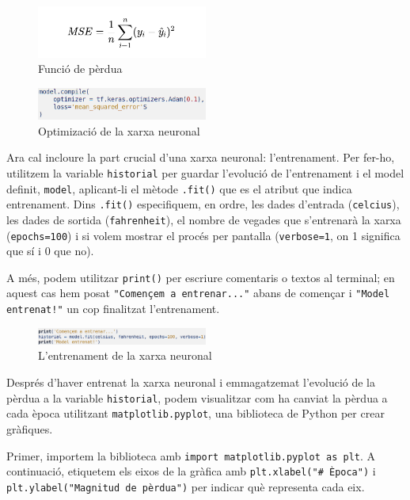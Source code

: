 \begin{figure}[H]
    \centering
    \includegraphics[width=0.5\textwidth]{./figures/5.png}
    \caption{Funció de pèrdua}
\end{figure}


\begin{figure}[H]
    \centering
    \includegraphics[width=0.5\textwidth]{./figures/4.png}
    \caption{Optimizació de la xarxa neuronal}
\end{figure}

Ara cal incloure la part crucial d'una xarxa neuronal: l'entrenament. Per fer-ho, utilitzem la variable \texttt{historial} per guardar l'evolució de l'entrenament i el model definit, \texttt{model}, aplicant-li el mètode \texttt{.fit()} que es el atribut que indica entrenament. Dins \texttt{.fit()} especifiquem, en ordre, les dades d'entrada (\texttt{celcius}), les dades de sortida (\texttt{fahrenheit}), el nombre de vegades que s'entrenarà la xarxa (\texttt{epochs=100}) i si volem mostrar el procés per pantalla (\texttt{verbose=1}, on 1 significa que sí i 0 que no).

A més, podem utilitzar \texttt{print()} per escriure comentaris o textos al terminal; en aquest cas hem posat \texttt{"Començem a entrenar..."} abans de començar i \texttt{"Model entrenat!"} un cop finalitzat l'entrenament.

\begin{figure}[H]
    \centering
    \includegraphics[width=0.5\textwidth]{./figures/6.png}
    \caption{L'entrenament de la xarxa neuronal}
\end{figure}

Després d’haver entrenat la xarxa neuronal i emmagatzemat l’evolució de la pèrdua a la variable \texttt{historial}, podem visualitzar com ha canviat la pèrdua a cada època utilitzant \texttt{matplotlib.pyplot}, una biblioteca de Python per crear gràfiques.

Primer, importem la biblioteca amb \texttt{import matplotlib.pyplot as plt}. A continuació, etiquetem els eixos de la gràfica amb \texttt{plt.xlabel("\# Època")} i \texttt{plt.ylabel("Magnitud de pèrdua")} per indicar què representa cada eix.

